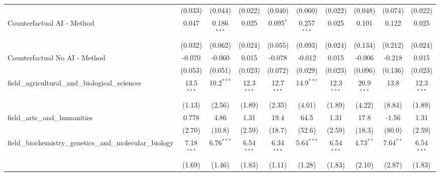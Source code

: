 \begin{tabular}{lccccccccc}
                                                               & (0.033)       & (0.044)       & (0.022)       & (0.040)      & (0.060)       & (0.022)       & (0.048)       & (0.074)        & (0.022)\\   
   Counterfactual AI - Method                                  & 0.047         & 0.186$^{***}$ & 0.025         & 0.095$^{*}$  & 0.257$^{***}$ & 0.025         & 0.101         & 0.122          & 0.025\\   
                                                               & (0.032)       & (0.062)       & (0.024)       & (0.055)      & (0.093)       & (0.024)       & (0.134)       & (0.212)        & (0.024)\\   
   Counterfactual No AI - Method                               & -0.070        & -0.060        & 0.015         & -0.078       & -0.012        & 0.015         & -0.006        & -0.218         & 0.015\\   
                                                               & (0.053)       & (0.051)       & (0.023)       & (0.072)      & (0.029)       & (0.023)       & (0.096)       & (0.136)        & (0.023)\\   
   field\_agricultural\_and\_biological\_sciences              & 13.5$^{***}$  & 10.2$^{***}$  & 12.3$^{***}$  & 12.7$^{***}$ & 14.9$^{***}$  & 12.3$^{***}$  & 20.9$^{***}$  & 13.8           & 12.3$^{***}$\\   
                                                               & (1.13)        & (2.56)        & (1.89)        & (2.35)       & (4.01)        & (1.89)        & (4.22)        & (8.84)         & (1.89)\\   
   field\_arts\_and\_humanities                                & 0.778         & 4.86          & 1.31          & 19.4         & 64.5          & 1.31          & 17.8          & -1.56          & 1.31\\   
                                                               & (2.70)        & (10.8)        & (2.59)        & (18.7)       & (52.6)        & (2.59)        & (18.3)        & (80.0)         & (2.59)\\   
   field\_biochemistry\_genetics\_and\_molecular\_biology      & 7.18$^{***}$  & 6.76$^{***}$  & 6.54$^{***}$  & 6.34$^{***}$ & 5.64$^{***}$  & 6.54$^{***}$  & 4.73$^{**}$   & 7.64$^{**}$    & 6.54$^{***}$\\   
                                                               & (1.69)        & (1.46)        & (1.83)        & (1.11)       & (1.28)        & (1.83)        & (2.10)        & (2.87)         & (1.83)\\   

\end{tabular}
